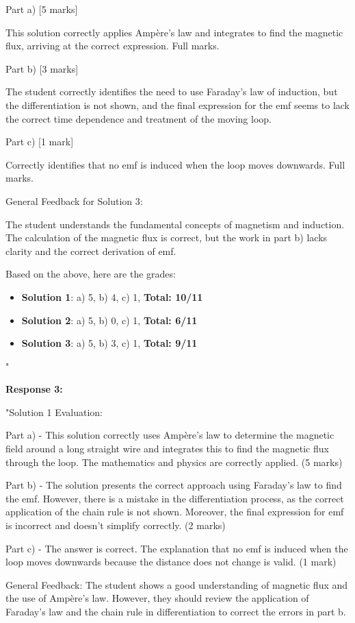 \documentclass[a4paper,11pt]{article}
\begin{document}
Part a) [5 marks]

This solution correctly applies Amp\`ere's law and integrates to find the magnetic flux, arriving at the correct expression. Full marks.

Part b) [3 marks]

The student correctly identifies the need to use Faraday's law of induction, but the differentiation is not shown, and the final expression for the emf seems to lack the correct time dependence and treatment of the moving loop.

Part c) [1 mark]

Correctly identifies that no emf is induced when the loop moves downwards. Full marks.

General Feedback for Solution 3:

The student understands the fundamental concepts of magnetism and induction. The calculation of the magnetic flux is correct, but the work in part b) lacks clarity and the correct derivation of emf. 

Based on the above, here are the grades:

\begin{itemize}
    \item \textbf{Solution 1}: a) 5, b) 4, c) 1, \textbf{Total: 10/11}
    \item \textbf{Solution 2}: a) 5, b) 0, c) 1, \textbf{Total: 6/11}
    \item \textbf{Solution 3}: a) 5, b) 3, c) 1, \textbf{Total: 9/11}
\end{itemize} 
"

\textbf{Response 3:}

"Solution 1 Evaluation:

Part a) - This solution correctly uses Ampère's law to determine the magnetic field around a long straight wire and integrates this to find the magnetic flux through the loop. The mathematics and physics are correctly applied. (5 marks)

Part b) - The solution presents the correct approach using Faraday's law to find the emf. However, there is a mistake in the differentiation process, as the correct application of the chain rule is not shown. Moreover, the final expression for emf is incorrect and doesn't simplify correctly. (2 marks)

Part c) - The answer is correct. The explanation that no emf is induced when the loop moves downwards because the distance does not change is valid. (1 mark)

General Feedback: The student shows a good understanding of magnetic flux and the use of Ampère's law. However, they should review the application of Faraday's law and the chain rule in differentiation to correct the errors in part b.
\end{document}
